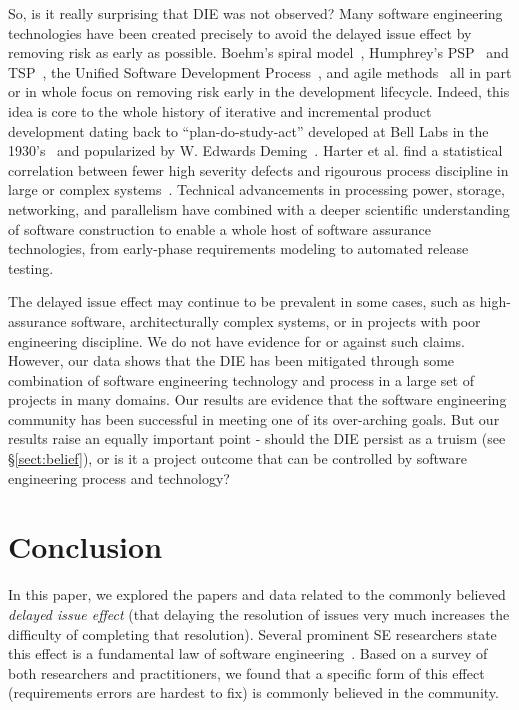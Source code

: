 \documentclass[smallcondensed]{svjour3}
\begin{document}
So, is it really surprising that DIE was not observed? Many software engineering technologies have been created precisely to avoid the delayed issue effect by removing risk as early as possible. Boehm's spiral model~\cite{boehm1988spiral}, Humphrey's PSP~\cite{humphrey1995discipline} and TSP~\cite{tsp00}, the Unified Software Development Process~\cite{jacobson1999unified}, and agile methods~\cite{Beck2001a} all in part or in whole focus on removing risk early in the development lifecycle. Indeed, this idea is core to the whole history of iterative and incremental product development dating back to ``plan-do-study-act'' developed at Bell Labs in the 1930's~\cite{larman2003iterative} and popularized by W. Edwards Deming~\cite{deming1986out}. Harter et al. find a statistical correlation between fewer high severity defects and rigourous process discipline in large or complex systems~\cite{harter2012does}. Technical advancements in processing power, storage, networking, and parallelism have combined with a deeper scientific understanding of software construction to enable a whole host of software assurance technologies, from early-phase requirements modeling to automated release testing.

The delayed issue effect may continue to be prevalent in some cases, such as high-assurance software, architecturally complex systems, or in projects with poor engineering discipline. We do not have evidence for or against such claims. However, our data shows that the DIE has been mitigated through some combination of software engineering technology and process in a large set of projects in many domains. Our results are evidence that the software engineering community has been successful in meeting one of its over-arching goals. But our results raise an equally important point - should the DIE persist as a truism (see \S\ref{sect:belief}), or is it a project outcome that can be controlled by software engineering process and technology?
 
 
 \section{Conclusion}
 \label{sect:conclusion}
 
In this paper, we explored   the papers and data related to the 
commonly believed {\em delayed issue effect} (that delaying the resolution of issues
very much 
increases the difficulty of completing that  resolution).
Several prominent SE researchers state this effect is a fundamental law of software engineering~\cite{mcconnell01,boehm01,glass02}.
Based on a  survey  of both researchers and practitioners, we  found that
a specific form  of this effect (requirements errors are hardest to fix) is  commonly believed in the community.  
\end{document}

